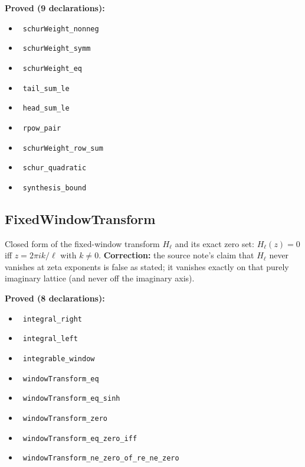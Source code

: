 \documentclass{report}
\theoremstyle{definition}
\begin{document}
\noindent\textbf{Proved (9 declarations):}
\begin{itemize}
  \item {}\leanok\ \texttt{schurWeight\_nonneg}
  \item {}\leanok\ \texttt{schurWeight\_symm}
  \item {}\leanok\ \texttt{schurWeight\_eq}
  \item {}\leanok\ \texttt{tail\_sum\_le}
  \item {}\leanok\ \texttt{head\_sum\_le}
  \item {}\leanok\ \texttt{rpow\_pair}
  \item {}\leanok\ \texttt{schurWeight\_row\_sum}
  \item {}\leanok\ \texttt{schur\_quadratic}
  \item {}\leanok\ \texttt{synthesis\_bound}
\end{itemize}

\subsection{FixedWindowTransform}
Closed form of the fixed-window transform $H_\ell$ and its exact zero set: $H_\ell(z)=0$ iff $z=2\pi ik/\ell$ with $k\ne0$. \textbf{Correction:} the source note's claim that $H_\ell$ never vanishes at zeta exponents is false as stated; it vanishes exactly on that purely imaginary lattice (and never off the imaginary axis).

\noindent\textbf{Proved (8 declarations):}
\begin{itemize}
  \item {}\leanok\ \texttt{integral\_right}
  \item {}\leanok\ \texttt{integral\_left}
  \item {}\leanok\ \texttt{integrable\_window}
  \item {}\leanok\ \texttt{windowTransform\_eq}
  \item {}\leanok\ \texttt{windowTransform\_eq\_sinh}
  \item {}\leanok\ \texttt{windowTransform\_zero}
  \item {}\leanok\ \texttt{windowTransform\_eq\_zero\_iff}
  \item {}\leanok\ \texttt{windowTransform\_ne\_zero\_of\_re\_ne\_zero}
\end{itemize}
\end{document}
